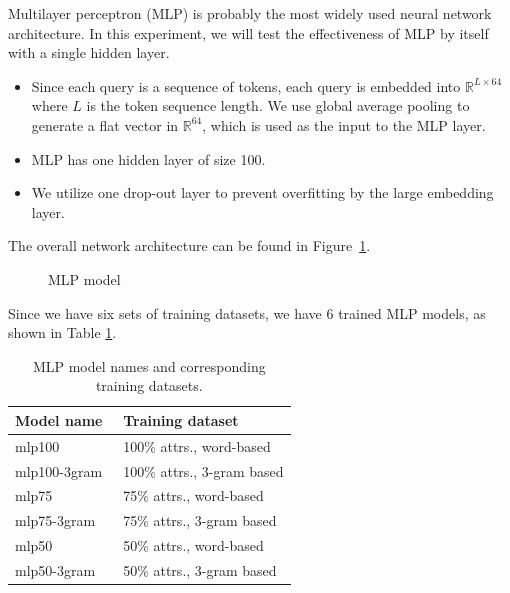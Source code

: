 
Multilayer perceptron (MLP) is probably the most widely used neural network architecture.  In this experiment, we will test the effectiveness of MLP by itself with a single hidden layer.


\begin{itemize}
    \item Since each query is a sequence of tokens, each query is embedded into
    $\mathbb{R}^{L\times 64}$ where $L$ is the token sequence length.  We use global
    average pooling to generate a flat vector in $\mathbb{R}^{64}$, which is used as the input to the MLP layer.
    \item MLP has one hidden layer of size 100.
    \item We utilize one drop-out layer to prevent overfitting by the large embedding layer.
\end{itemize}

The overall network architecture can be found in Figure~\ref{fig:mlp_model}.
\begin{figure}[!th]
	\centering
	
	\caption{MLP model}
	\label{fig:mlp_model}
\end{figure}
Since we have six sets of training datasets, we have 6 trained MLP models, as shown in Table \ref{tab:trained_mlp_models}.
\begin{table}[!th]
	\centering
	\begin{tabularx}{0.8\textwidth}{|l|X|}
		\hline
		\textbf{Model name} & \textbf{Training dataset} \\ \hline
		mlp100 & 100\% attrs., word-based \\
		mlp100-3gram\ & 100\% attrs., 3-gram based \\ 
		mlp75 & 75\% attrs., word-based \\
		mlp75-3gram & 75\% attrs., 3-gram based \\ 
		mlp50 & 50\% attrs., word-based \\
		mlp50-3gram & 50\% attrs., 3-gram based \\ 
		\hline
	\end{tabularx}
	\caption{MLP model names and corresponding training datasets.}
	\label{tab:trained_mlp_models}
\end{table}


